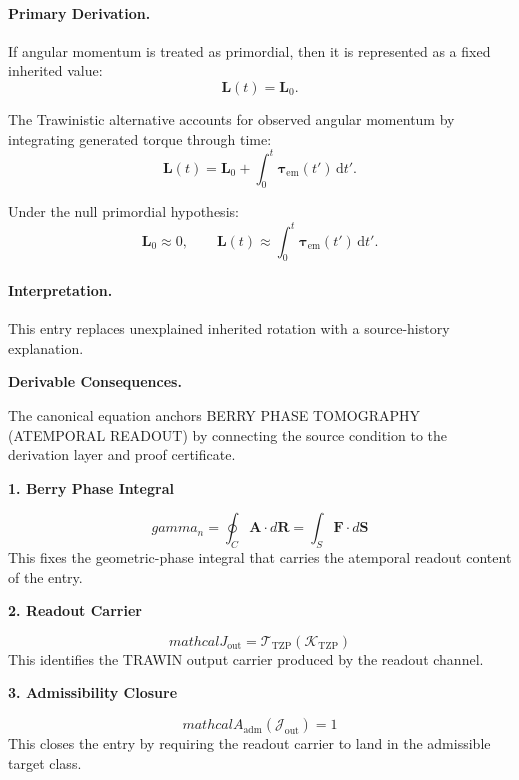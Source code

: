\paragraph{Primary Derivation.}
If angular momentum is treated as primordial, then it is represented as a fixed inherited value:
\begin{equation}
\mathbf{L}(t)=\mathbf{L}_0.
\end{equation}

The Trawinistic alternative accounts for observed angular momentum by integrating generated torque through time:
\begin{equation}
\mathbf{L}(t)
=
\mathbf{L}_0
+
\int_0^t
\boldsymbol{\tau}_{\mathrm{em}}(t')
\,\mathrm{d}t' .
\end{equation}

Under the null primordial hypothesis:
\begin{equation}
\boxed{
\mathbf{L}_0\approx 0,
\qquad
\mathbf{L}(t)
\approx
\int_0^t
\boldsymbol{\tau}_{\mathrm{em}}(t')
\,\mathrm{d}t' .
}
\end{equation}

\paragraph{Interpretation.}
This entry replaces unexplained inherited rotation with a source-history explanation.

\par\vspace{0.35em}
\noindent\textbf{Derivable Consequences.}\quad
\begingroup
\footnotesize
\raggedright
The canonical equation anchors BERRY PHASE TOMOGRAPHY (ATEMPORAL READOUT) by connecting the source condition to the derivation layer and proof certificate.
\par\endgroup

\noindent\textbf{1. Berry Phase Integral}\par
\[
gamma_{n}=\oint_{C}\mathbf{A}\cdot d\mathbf{R}=\int_{S}\mathbf{F}\cdot d\mathbf{S}
\]
\noindent This fixes the geometric-phase integral that carries the atemporal readout content of the entry.\par
\noindent\textbf{2. Readout Carrier}\par
\[
mathcal{J}_{\mathrm{out}}=\mathcal{T}_{\mathrm{TZP}}\!\left(\mathcal{K}_{\mathrm{TZP}}\right)
\]
\noindent This identifies the TRAWIN output carrier produced by the readout channel.\par
\noindent\textbf{3. Admissibility Closure}\par
\[
mathcal{A}_{\mathrm{adm}}\!\left(\mathcal{J}_{\mathrm{out}}\right)=1
\]
\noindent This closes the entry by requiring the readout carrier to land in the admissible target class.\par

